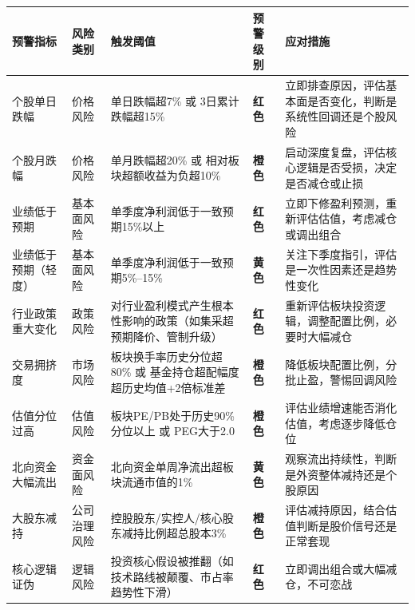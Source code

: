 \begin{exhibitbox}[表9-12：核心预警指标与阈值设定]
\scriptsize
\setlength{\tabcolsep}{2.5pt}
\renewcommand{\arraystretch}{1.08}
\begin{tabularx}{\linewidth}{l l l >{\centering\arraybackslash}p{2.5em} >{\raggedright\arraybackslash}X}
\toprule
\textbf{预警指标} & \textbf{风险类别} & \textbf{触发阈值} & \textbf{预警级别} & \textbf{应对措施} \\
\midrule
\rowcolor{riskred!6}
个股单日跌幅 & 价格风险 & 单日跌幅超7\% 或 3日累计跌幅超15\% & \cellcolor{riskred!25}\textbf{红色} & 立即排查原因，评估基本面是否变化，判断是系统性回调还是个股风险 \\
\rowcolor{riskamber!6}
个股月跌幅 & 价格风险 & 单月跌幅超20\% 或 相对板块超额收益为负超10\% & \cellcolor{riskamber!25}\textbf{橙色} & 启动深度复盘，评估核心逻辑是否受损，决定是否减仓或止损 \\
\rowcolor{riskred!6}
业绩低于预期 & 基本面风险 & 单季度净利润低于一致预期15\%以上 & \cellcolor{riskred!25}\textbf{红色} & 立即下修盈利预测，重新评估估值，考虑减仓或调出组合 \\
\rowcolor{riskgreen!6}
业绩低于预期（轻度） & 基本面风险 & 单季度净利润低于一致预期5\%--15\% & \cellcolor{riskgreen!25}\textbf{黄色} & 关注下季度指引，评估是一次性因素还是趋势性变化 \\
\rowcolor{riskred!6}
行业政策重大变化 & 政策风险 & 对行业盈利模式产生根本性影响的政策（如集采超预期降价、管制升级） & \cellcolor{riskred!25}\textbf{红色} & 重新评估板块投资逻辑，调整配置比例，必要时大幅减仓 \\
\rowcolor{riskamber!6}
交易拥挤度 & 市场风险 & 板块换手率历史分位超80\% 或 基金持仓超配幅度超历史均值+2倍标准差 & \cellcolor{riskamber!25}\textbf{橙色} & 降低板块配置比例，分批止盈，警惕回调风险 \\
\rowcolor{riskamber!6}
估值分位过高 & 估值风险 & 板块PE/PB处于历史90\%分位以上 或 PEG大于2.0 & \cellcolor{riskamber!25}\textbf{橙色} & 评估业绩增速能否消化估值，考虑逐步降低仓位 \\
\rowcolor{riskgreen!6}
北向资金大幅流出 & 资金面风险 & 北向资金单周净流出超板块流通市值的1\% & \cellcolor{riskgreen!25}\textbf{黄色} & 观察流出持续性，判断是外资整体减持还是个股原因 \\
\rowcolor{riskamber!6}
大股东减持 & 公司治理风险 & 控股股东/实控人/核心股东减持比例超总股本3\% & \cellcolor{riskamber!25}\textbf{橙色} & 评估减持原因，结合估值判断是股价信号还是正常套现 \\
\rowcolor{riskred!6}
核心逻辑证伪 & 逻辑风险 & 投资核心假设被推翻（如技术路线被颠覆、市占率趋势性下滑） & \cellcolor{riskred!25}\textbf{红色} & 立即调出组合或大幅减仓，不可恋战 \\

\end{tabularx}
\end{exhibitbox}
